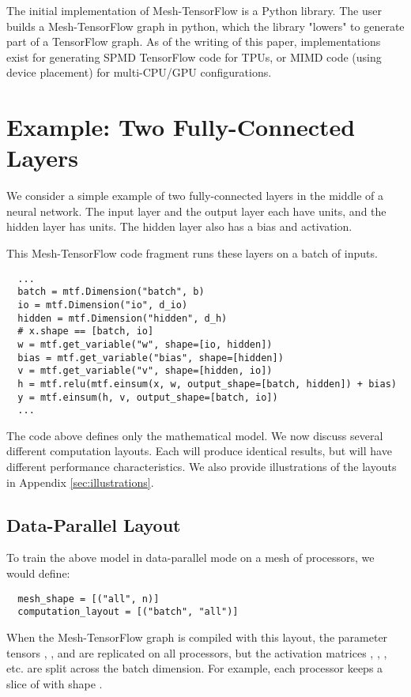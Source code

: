 \documentclass{article}
\begin{document}
The initial implementation of Mesh-TensorFlow is a Python library.  The user builds a Mesh-TensorFlow graph in python, which the library "lowers" to generate part of a TensorFlow graph.  As of the writing of this paper, implementations exist for generating SPMD TensorFlow code for TPUs, or MIMD code (using device placement) for multi-CPU/GPU configurations.







\section{Example: Two Fully-Connected Layers} \label{example}
We consider a simple example of two fully-connected layers in the middle of a neural network.  The input layer  and the output layer  each have  units, and the hidden layer  has  units.  The hidden layer also has a bias and  activation.




This Mesh-TensorFlow code fragment runs these layers on a batch  of  inputs.

\begin{verbatim}
  ...
  batch = mtf.Dimension("batch", b)
  io = mtf.Dimension("io", d_io)
  hidden = mtf.Dimension("hidden", d_h)
  # x.shape == [batch, io]
  w = mtf.get_variable("w", shape=[io, hidden])
  bias = mtf.get_variable("bias", shape=[hidden])
  v = mtf.get_variable("v", shape=[hidden, io])
  h = mtf.relu(mtf.einsum(x, w, output_shape=[batch, hidden]) + bias)
  y = mtf.einsum(h, v, output_shape=[batch, io])
  ...
\end{verbatim}

The code above defines only the mathematical model.  We now discuss several different computation layouts.  Each will produce identical results, but will have different performance characteristics. We also provide illustrations of the layouts in Appendix \ref{sec:illustrations}.

\subsection{Data-Parallel Layout}
To train the above model in data-parallel mode on a mesh of  processors, we would define:
\begin{verbatim}
  mesh_shape = [("all", n)]
  computation_layout = [("batch", "all")]
\end{verbatim}
When the Mesh-TensorFlow graph is compiled with this layout, the parameter tensors , , and  are replicated on all processors, but the activation matrices , , , etc. are split across the batch dimension.  For example, each processor keeps a slice of  with shape .
\end{document}
